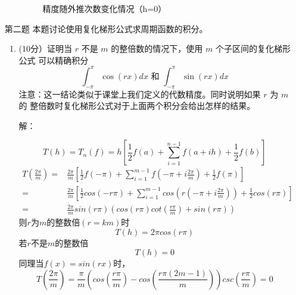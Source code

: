 \documentclass[12pt,a4paper,UTF8]{ctexart}
\theoremstyle{nonumberplain}
\begin{document}
\begin{enumerate}
\begin{enumerate}
\begin{figure}[H]
                        \caption{精度随外推次数变化情况（h=0）}
                    \end{figure}
          \end{enumerate}
    \item[第二题] 本题讨论使用复化梯形公式求周期函数的积分。
          \begin{enumerate}
              \item
                    (10分）证明当 $r$ 不是 $m$ 的整倍数的情况下，使用 $m$ 个子区间的复化梯形公式
                    可以精确积分
                    $$
                        \int_{-\pi}^{\pi} \cos (r x) d x  \text { 和 }  \int_{-\pi}^{\pi} \sin (r x) d x
                    $$
                    注意：这一结论类似于课堂上我们定义的代数精度。同时说明如果 $r$ 为 $m$ 的
                    整倍数时复化梯形公式对于上面两个积分会给出怎样的结果。
                    \par 解：
                    \par
                    $$
                        T(h)=T_{n}(f)=h\left[\frac{1}{2} f(a)+\sum_{i=1}^{n-1} f(a+i h)+\frac{1}{2} f(b)\right]
                    $$
                    $$\begin{aligned}
                            T\left(\frac{2\pi}{m}\right)= & \frac{2\pi}{m}\left[\frac{1}{2} f(-\pi)+\sum_{i=1}^{m-1} f(-\pi+i \frac{2\pi}{m})+\frac{1}{2} f(\pi)\right]            \\
                            =                             & \frac{2\pi}{m}\left[\frac{1}{2} cos(-r\pi)+\sum_{i=1}^{m-1} cos(r(-\pi+i \frac{2\pi}{m}))+\frac{1}{2} cos(r\pi)\right] \\
                            =                             & \frac{2\pi}{m}sin(r\pi)\left(cos\left(r\pi\right)cot\left(\frac{r\pi}{m}\right)+sin(r\pi)\right)\end{aligned}
                    $$
                    则$r$为$m$的整数倍$(r=km)$时
                    $$T(h)={2\pi}cos(r\pi)$$
                    若$r$不是$m$的整数倍
                    $$T(h)=0$$
                    同理当$f(x)=sin(rx)$时，
                    $$T\left(\frac{2\pi}{m}\right)=\frac{\pi}{m}\left(cos\left(\frac{r\pi}{m}\right)-cos\left(\frac{r\pi (2m-1)}{m}\right)\right)csc(\frac{r\pi}{m})=0$$


\end{enumerate}
\end{enumerate}
\end{document}
